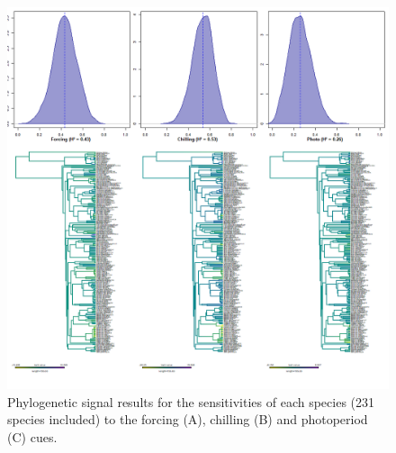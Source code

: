 \documentclass{article}\usepackage[]{graphicx}\usepackage[]{color}
\begin{document}
\begin{figure} [H]
  \begin{center}
  \includegraphics[width=14cm]{..//..//analyses/phylogeny/figures/Sensitivities_phylosig_spslev231.png}
  \caption{Phylogenetic signal results for the sensitivities of each species (231 species included) to the forcing (A), chilling (B) and photoperiod (C) cues.}
  \label{fig:phylosig_231spp}
  \end{center}
\end{figure}
\end{document}
